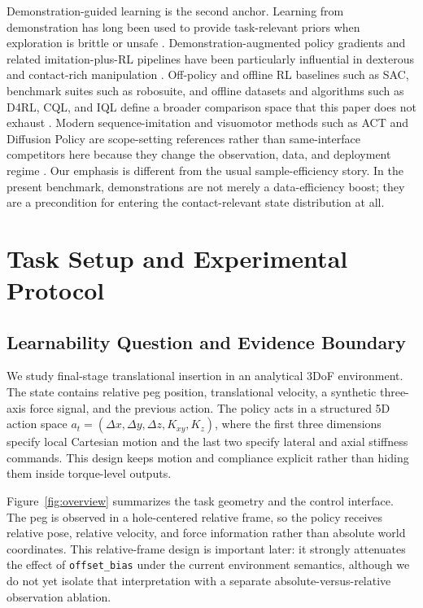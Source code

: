﻿\documentclass[11pt]{article}
\newcommand{\code}[1]{\nolinkurl{#1}}
\begin{document}
Demonstration-guided learning is the second anchor. Learning from demonstration has long been used
to provide task-relevant priors when exploration is brittle or unsafe
\citep{argall2009_lfd_survey,billard2008_robot_programming_by_demonstration,ijspeert2013_dmp}.
Demonstration-augmented policy gradients and related imitation-plus-RL pipelines have been
particularly influential in dexterous and contact-rich manipulation
\citep{vecerik2017_demo_sparse_rewards,rajeswaran2018_dexterous_demo_rl,
johannink2019_residual_rl,wang2022_adaptive_imitation_insertion}. Off-policy and offline RL
baselines such as SAC, benchmark suites such as robosuite, and offline datasets and algorithms
such as D4RL, CQL, and IQL define a broader comparison space that this paper does not exhaust
\citep{haarnoja2018_sac,zhu2020_robosuite,fu2020_d4rl,kumar2020_cql,
kostrikov2022_iql}. Modern sequence-imitation and visuomotor methods such as ACT and Diffusion
Policy are scope-setting references rather than same-interface competitors here because they
change the observation, data, and deployment regime
\citep{zhao2023_action_chunking_transformers,chi2023_diffusion_policy}. Our emphasis is different
from the usual sample-efficiency story. In the present benchmark, demonstrations are not merely a
data-efficiency boost; they are a precondition for entering the contact-relevant state distribution
at all.

\section{Task Setup and Experimental Protocol}
\label{sec:setup}

\subsection{Learnability Question and Evidence Boundary}

We study final-stage translational insertion in an analytical 3DoF environment. The state contains
relative peg position, translational velocity, a synthetic three-axis force signal, and the
previous action. The policy acts in a structured 5D action space
$a_t = (\Delta x, \Delta y, \Delta z, K_{xy}, K_z)$, where the first three dimensions specify local
Cartesian motion and the last two specify lateral and axial stiffness commands. This design keeps
motion and compliance explicit rather than hiding them inside torque-level outputs.

Figure~\ref{fig:overview} summarizes the task geometry and the control interface. The peg is
observed in a hole-centered relative frame, so the policy receives relative pose, relative
velocity, and force information rather than absolute world coordinates. This relative-frame design
is important later: it strongly attenuates the effect of \code{offset\_bias} under the current
environment semantics, although we do not yet isolate that interpretation with a separate
absolute-versus-relative observation ablation.
\end{document}
